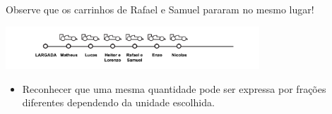 \begin{orientacoes}
\begin{itemize}
\end{itemize} %




\end{orientacoes}

\begin{solucao}{}{}
Observe que os carrinhos de Rafael e Samuel pararam no mesmo lugar!

\hspace{-15mm} \includegraphics[width=95mm, keepaspectratio]{../figuras/licao02/ativ12_resposta.png}

\end{solucao}

\newpage

\begin{objetivos}{}{}
\begin{itemize} %
    \item Reconhecer que uma mesma quantidade pode ser expressa por frações diferentes dependendo da unidade escolhida.
\end{itemize} %
\end{objetivos}

